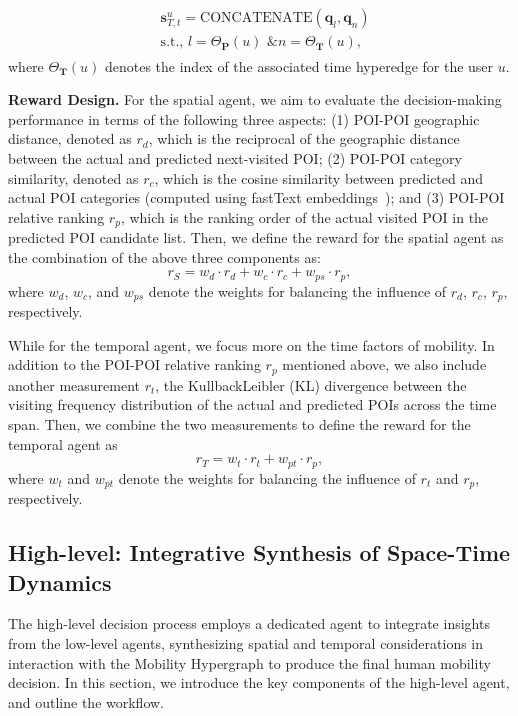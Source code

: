 \documentclass[letterpaper]{article} %
\begin{document}
\begin{align}
\begin{split}
    &\mathbf{s}^{u}_{T, t} = \text{CONCATENATE} (\mathbf{q}_l, \mathbf{q}_n) \\
    &\text{s.t., }l=\Theta_{\mathbf{P}}(u) \text{ \& }
 n=\Theta_{\mathbf{T}}(u),
 \end{split}
\end{align}
where $\Theta_{\mathbf{T}}(u)$ denotes the index of the associated time hyperedge for the user $u$.


\noindent\textbf{Reward Design. }
For the spatial agent, we aim to evaluate the decision-making performance in terms of the following three aspects:
(1) POI-POI geographic distance, denoted as $ r_d $, which is the reciprocal of the geographic distance between the actual and predicted next-visited POI;
(2) POI-POI category similarity, denoted as $ r_c $, which is the cosine similarity between predicted and actual POI categories (computed using fastText embeddings~\cite{bojanowski2017enriching}); and
(3) POI-POI relative ranking $ r_p $, which is the ranking order of the actual visited POI in the predicted POI candidate list.
Then, we define the reward for the spatial agent as the combination of the above three components as:
\begin{equation}
r_{S} = w_{d} \cdot r_{d} + w_{c} \cdot r_{c} + w_{ps} \cdot r_{p},
\end{equation}
where  $ w_{d} $, $ w_{c} $, and $ w_{ps} $ denote the weights for balancing the influence of $r_d$, $r_c$, $r_p$, respectively.

While for the temporal agent, we focus more on the time factors of mobility.
In addition to the POI-POI relative ranking $ r_p $ mentioned above, we also include another measurement $r_t$, the KullbackLeibler (KL) divergence between the visiting frequency distribution of the actual and predicted POIs across the time span.
Then, we combine the two measurements to define the reward for the temporal agent as
\begin{equation}
    r_{T} = w_{t} \cdot r_{t} + w_{pt} \cdot r_{p},
\end{equation}
where $w_{t}$ and $w_{pt}$ denote the weights for balancing the influence of $r_t$ and $r_p$, respectively.


\subsection{High-level: Integrative Synthesis of Space-Time Dynamics}
The high-level decision process employs a dedicated agent to integrate insights from the low-level agents, synthesizing spatial and temporal considerations in interaction with the Mobility Hypergraph to produce the final human mobility decision.
In this section, we introduce the key components of the high-level agent, and outline the workflow.
\end{document}
